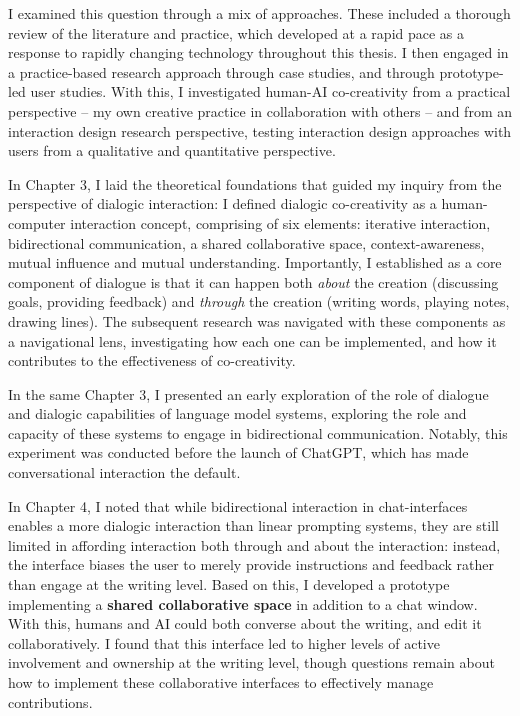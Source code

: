 I examined this question through a mix of approaches. These included a thorough review of the literature and practice, which developed at a rapid pace as a response to rapidly changing technology throughout this thesis. I then engaged in a practice-based research approach through case studies, and through prototype-led user studies. With this, I investigated human-AI co-creativity from a practical perspective -- my own creative practice in collaboration with others -- and from an interaction design research perspective, testing interaction design approaches with users from a qualitative and quantitative perspective.

In Chapter 3, I laid the theoretical foundations that guided my inquiry from the perspective of dialogic interaction: I defined dialogic co-creativity as a human-computer interaction concept, comprising of six elements: iterative interaction, bidirectional communication, a shared collaborative space, context-awareness, mutual influence and mutual understanding. Importantly, I established as a core component of dialogue is that it can happen both \textit{about} the creation (discussing goals, providing feedback) and \textit{through} the creation (writing words, playing notes, drawing lines). The subsequent research was navigated with these components as a navigational lens, investigating how each one can be implemented, and how it contributes to the effectiveness of co-creativity.

In the same Chapter 3, I presented an early exploration of the role of dialogue and dialogic capabilities of language model systems, exploring the role and capacity of these systems to engage in bidirectional communication. Notably, this experiment was conducted before the launch of ChatGPT, which has made conversational interaction the default.

In Chapter 4, I noted that while bidirectional interaction in chat-interfaces enables a more dialogic interaction than linear prompting systems, they are still limited in affording interaction both through and about the interaction: instead, the interface biases the user to merely provide instructions and feedback rather than engage at the writing level. Based on this, I developed a prototype implementing a \textbf{shared collaborative space} in addition to a chat window. With this, humans and AI could both converse about the writing, and edit it collaboratively. I found that this interface led to higher levels of active involvement and ownership at the writing level, though questions remain about how to implement these collaborative interfaces to effectively manage contributions.

